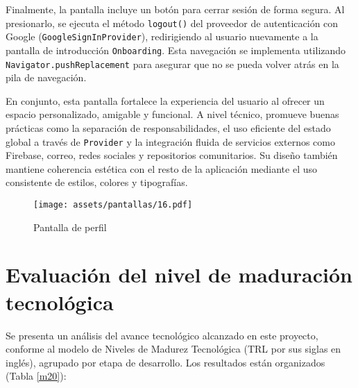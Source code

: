 Finalmente, la pantalla incluye un botón para cerrar sesión de forma segura. Al presionarlo, se ejecuta el método \texttt{logout()} del proveedor de autenticación con Google (\texttt{GoogleSignInProvider}), redirigiendo al usuario nuevamente a la pantalla de introducción \texttt{Onboarding}. Esta navegación se implementa utilizando \texttt{Navigator.pushReplacement} para asegurar que no se pueda volver atrás en la pila de navegación.

En conjunto, esta pantalla fortalece la experiencia del usuario al ofrecer un espacio personalizado, amigable y funcional. A nivel técnico, promueve buenas prácticas como la separación de responsabilidades, el uso eficiente del estado global a través de \texttt{Provider} y la integración fluida de servicios externos como Firebase, correo, redes sociales y repositorios comunitarios. Su diseño también mantiene coherencia estética con el resto de la aplicación mediante el uso consistente de estilos, colores y tipografías.



\begin{figure}[h!]
\centering
  \texttt{[image: assets/pantallas/16.pdf]}
  \caption{Pantalla de perfil}
  \label{pantallas16}
\end{figure}

 
\newpage
\section{Evaluación del nivel de maduración tecnológica}
Se presenta un análisis del avance tecnológico alcanzado en este proyecto, conforme al modelo de Niveles de Madurez Tecnológica (TRL por sus siglas en inglés), agrupado por etapa de desarrollo. Los resultados están organizados (Tabla \ref{m20}):


